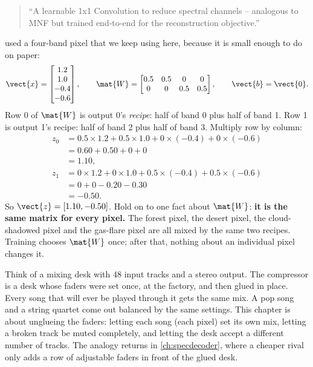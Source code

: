 \begin{quote}\small
``A learnable 1x1 Convolution to reduce spectral channels -- analogous to MNF but trained end-to-end for the reconstruction objective.''
\end{quote}

 used a four-band pixel that we keep using here, because it is small enough to do on paper:
\begin{equation}\label{eq:ceiling:toy}
  \vect{x} = \begin{bmatrix}1.2\\ 1.0\\ -0.4\\ -0.6\end{bmatrix},\qquad
  \mat{W} = \begin{bmatrix}0.5 & 0.5 & 0 & 0\\ 0 & 0 & 0.5 & 0.5\end{bmatrix},\qquad
  \vect{b} = \vect{0}.
\end{equation}
Row 0 of $\mat{W}$ is output 0's \emph{recipe}: half of band 0 plus half of band 1. Row 1 is output 1's recipe: half of band 2 plus half of band 3. Multiply row by column:
\begin{align*}
  z_0 &= 0.5\times 1.2 + 0.5\times 1.0 + 0\times(-0.4) + 0\times(-0.6)\\
      &= 0.60 + 0.50 + 0 + 0\\
      &= 1.10,\\
  z_1 &= 0\times 1.2 + 0\times 1.0 + 0.5\times(-0.4) + 0.5\times(-0.6)\\
      &= 0 + 0 - 0.20 - 0.30\\
      &= -0.50.
\end{align*}
So $\vect{z} = [1.10, -0.50]$. Hold on to one fact about $\mat{W}$: \textbf{it is the same matrix for every pixel.} The forest pixel, the desert pixel, the cloud-shadowed pixel and the gas-flare pixel are all mixed by the same two recipes. Training chooses $\mat{W}$ once; after that, nothing about an individual pixel changes it.

\begin{analogy}
Think of a mixing desk with 48 input tracks and a stereo output. The compressor is a desk whose faders were set once, at the factory, and then glued in place. Every song that will ever be played through it gets the same mix. A pop song and a string quartet come out balanced by the same settings. This chapter is about unglueing the faders: letting each song (each pixel) set its own mix, letting a broken track be muted completely, and letting the desk accept a different number of tracks. The analogy returns in \cref{ch:specdecoder}, where a cheaper rival only adds a row of adjustable faders in front of the glued desk.
\end{analogy}

